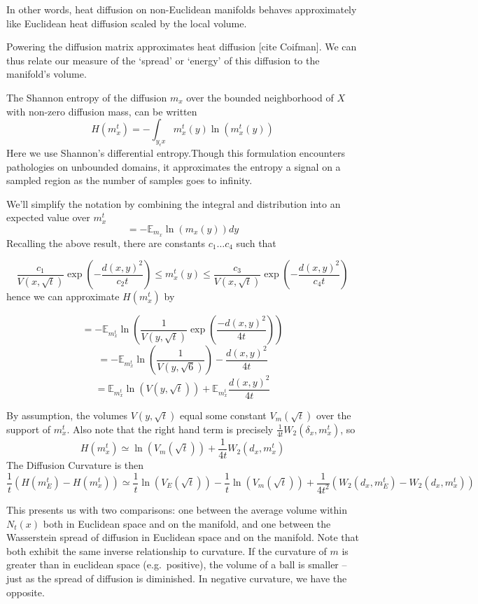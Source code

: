 \documentclass[
  letterpaper,
  DIV=11,
  numbers=noendperiod]{scrartcl}
\theoremstyle{plain}
\theoremstyle{definition}
\theoremstyle{plain}
\theoremstyle{definition}
\theoremstyle{plain}
\theoremstyle{remark}
\begin{document}
In other words, heat diffusion on non-Euclidean manifolds behaves
approximately like Euclidean heat diffusion scaled by the local volume.

Powering the diffusion matrix approximates heat diffusion {[}cite
Coifman{]}. We can thus relate our measure of the `spread' or `energy'
of this diffusion to the manifold's volume.

The Shannon entropy of the diffusion \(m_{x}\) over the bounded
neighborhood of \(X\) with non-zero diffusion mass, can be written \[
H\left(m_x^t\right)=-\int_{y_\epsilon x} m_x^t(y) \ln \left(m_x^t(y)\right)
\] Here we use Shannon's differential entropy.Though this formulation
encounters pathologies on unbounded domains, it approximates the entropy
a signal on a sampled region as the number of samples goes to infinity.

We'll simplify the notation by combining the integral and distribution
into an expected value over \(m_{x}^t\) \[
=-\mathbb{E}_{m_x} \ln \left(m_x(y)\right) d y
\] Recalling the above result, there are constants \(c_{1}\dots c_{4}\)
such that

\[
\frac{c_1}{V(x, \sqrt{t})} \exp \left(-\frac{d(x, y)^2}{c_2 t}\right) \leq m_{x}^t(y) \leq \frac{c_3}{V(x, \sqrt{t})} \exp \left(-\frac{d(x, y)^2}{c_4 t}\right)
\] hence we can approximate \(H(m_{x}^t)\) by

\[
=-\mathbb{E}_{m_{x}^t} \ln \left(\frac{1}{V(y, \sqrt{t})} \exp \left(\frac{-d(x, y)^2}{4 t}\right)\right)
\] \[
=-\mathbb{E}_{m_x^t} \ln \left(\frac{1}{V(y, \sqrt{6})}\right)-\frac{d(x, y)^2}{4 t}
\] \[
=\mathbb{E}_{m_x^t} \ln (V(y, \sqrt{t}))+\mathbb{E}_{m_{x}^t} \frac{d(x, y)^2}{4 t}
\]

By assumption, the volumes \(V(y,\sqrt{ t })\) equal some constant
\(V_{m}(\sqrt{ t })\) over the support of \(m_{x}^t\). Also note that
the right hand term is precisely
\(\frac{1}{4t}W_{2}(\delta_{x}, m_{x}^t)\), so \[
H(m_{x}^t) \simeq \ln(V_{m}(\sqrt{ t })) + \frac{1}{4t}W_{2}(d_{x},m_{x}^t)
\] The Diffusion Curvature is then \[
\frac{1}{t}(H(m_{E}^t) - H(m_{x}^t)) \simeq \frac{1}{t}\ln(V_{E}(\sqrt{ t })) - \frac{1}{t}\ln(V_{m}(\sqrt{ t })) + \frac{1}{4t^2}( W_{2}(d_{x},m_{E}^t) - W_{2}(d_{x},m_{x}^t))
\]

This presents us with two comparisons: one between the average volume
within \(N_{t}(x)\) both in Euclidean space and on the manifold, and one
between the Wasserstein spread of diffusion in Euclidean space and on
the manifold. Note that both exhibit the same inverse relationship to
curvature. If the curvature of \(m\) is greater than in euclidean space
(e.g.~positive), the volume of a ball is smaller -- just as the spread
of diffusion is diminished. In negative curvature, we have the opposite.
\end{document}
